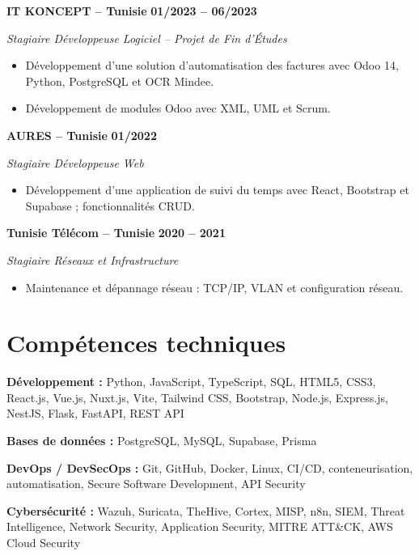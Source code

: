 \documentclass[10pt,a4paper]{article}
\begin{document}
\textbf{IT KONCEPT -- Tunisie}
\hfill \textbf{01/2023 -- 06/2023}

\textit{Stagiaire Développeuse Logiciel -- Projet de Fin d'Études}

\begin{itemize}
    \item Développement d'une solution d'automatisation des factures avec
    Odoo 14, Python, PostgreSQL et OCR Mindee.
    \item Développement de modules Odoo avec XML, UML et Scrum.
\end{itemize}

\textbf{AURES -- Tunisie}
\hfill \textbf{01/2022}

\textit{Stagiaire Développeuse Web}

\begin{itemize}
    \item Développement d'une application de suivi du temps avec React,
    Bootstrap et Supabase ; fonctionnalités CRUD.
\end{itemize}

\textbf{Tunisie Télécom -- Tunisie}
\hfill \textbf{2020 -- 2021}

\textit{Stagiaire Réseaux et Infrastructure}

\begin{itemize}
    \item Maintenance et dépannage réseau : TCP/IP, VLAN et configuration réseau.
\end{itemize}


\section*{Compétences techniques}

\textbf{Développement :}
Python, JavaScript, TypeScript, SQL, HTML5, CSS3, React.js, Vue.js, Nuxt.js,
Vite, Tailwind CSS, Bootstrap, Node.js, Express.js, NestJS, Flask, FastAPI,
REST API

\textbf{Bases de données :}
PostgreSQL, MySQL, Supabase, Prisma

\textbf{DevOps / DevSecOps :}
Git, GitHub, Docker, Linux, CI/CD, conteneurisation, automatisation,
Secure Software Development, API Security

\textbf{Cybersécurité :}
Wazuh, Suricata, TheHive, Cortex, MISP, n8n, SIEM, Threat Intelligence,
Network Security, Application Security, MITRE ATT\&CK, AWS Cloud Security
\end{document}
